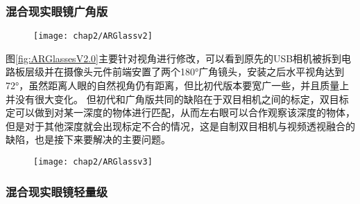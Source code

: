 \subsubsection{混合现实眼镜广角版}
\begin{figure}[!htp]
  \centering
  \texttt{[image: chap2/ARGlassv2]}
\end{figure}

图\ref{fig:ARGlassesV2.0}主要针对视角进行修改，可以看到原先的USB相机被拆到电路板层级并在摄像头元件前端安置了两个180°广角镜头，安装之后水平视角达到72°，虽然距离人眼的自然视角仍有距离，但比初代版本要宽广一些，并且质量上并没有很大变化。
但初代和广角版共同的缺陷在于双目相机之间的标定，双目标定可以做到对某一深度的物体进行匹配，从而左右眼可以合作观察该深度的物体，但是对于其他深度就会出现标定不合的情况，这是自制双目相机与视频透视融合的缺陷，也是接下来要解决的主要问题。

\begin{figure}[!htp]
  \centering
  \texttt{[image: chap2/ARGlassv3]}
\end{figure}

\subsubsection{混合现实眼镜轻量级}

